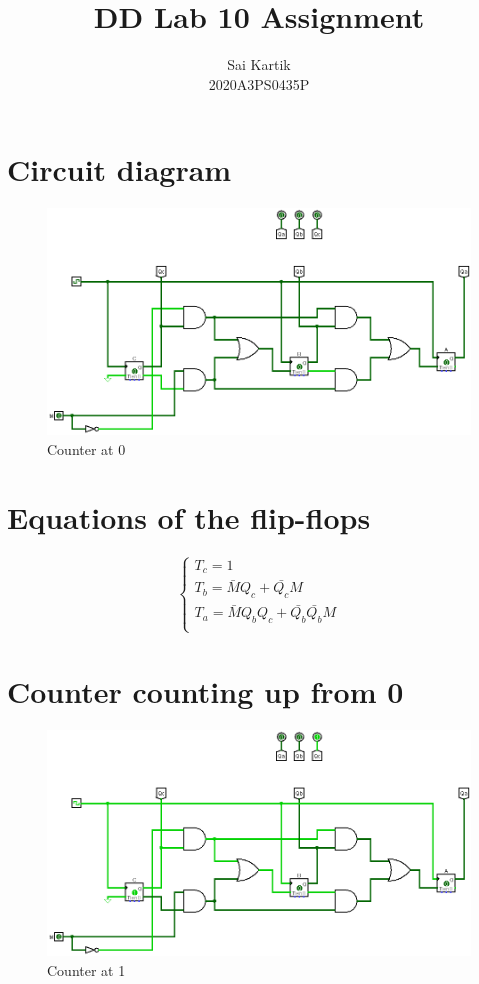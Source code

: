 \documentclass[12pt]{article}
\title{DD Lab 10 Assignment}
\author{Sai Kartik \\2020A3PS0435P}
\begin{document}
\maketitle
\section{Circuit diagram}
\begin{center}
    \begin{figure}[ht]
        \centering
        \includegraphics[scale=0.50]{zero.png}
        \caption{Counter at 0}
    \end{figure}
\end{center}
\section{Equations of the flip-flops}
\begin{equation}
    \label{eq:flipflop}
    \begin{cases}
        T_c=1                                 \\[1ex]
        T_b=\bar{M}Q_c+\bar{Q_c}M             \\[1ex]
        T_a=\bar{M}Q_bQ_c+\bar{Q_b}\bar{Q_b}M \\[1ex]
    \end{cases}
\end{equation}
\section{Counter counting up from 0}
\begin{center}
    \begin{figure}[ht]
        \centering
        \includegraphics[scale=0.50]{one.png}
        \caption{Counter at 1}
    \end{figure}
\end{center}
\newpage
\end{document}
